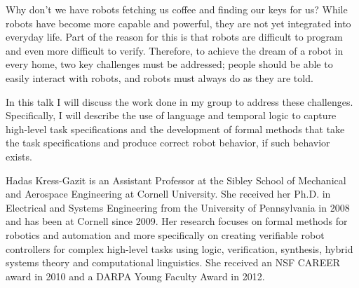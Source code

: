 {
Why don’t we have robots fetching us coffee and finding our keys for us? While robots have become more capable and powerful, they are not yet integrated into everyday life. Part of the reason for this is that robots are difficult to program and even more difficult to verify. Therefore, to achieve the dream of a robot in every home, two key challenges must be addressed; people should be able to easily interact with robots, and robots must always do as they are told.

In this talk I will discuss the work done in my group to address these challenges. Specifically, I will describe the use of language and temporal logic to capture high-level task specifications and the development of formal methods that take the task specifications and produce correct robot behavior, if such behavior exists.
}{
Hadas Kress-Gazit is an Assistant Professor at the Sibley School of Mechanical and Aerospace Engineering at Cornell University. She received her Ph.D. in Electrical and Systems Engineering from the University of Pennsylvania in 2008 and has been at Cornell since 2009. Her research focuses on formal methods for robotics and automation and more specifically on creating verifiable robot controllers for complex high-level tasks using logic, verification, synthesis, hybrid systems theory and computational linguistics. She received an NSF CAREER award in 2010 and a DARPA Young Faculty Award in 2012.
}
